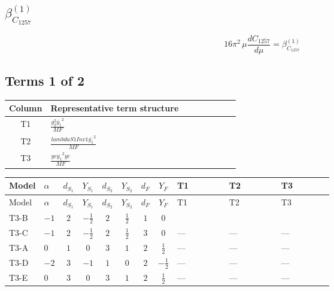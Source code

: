 \documentclass[8pt]{article}
\begin{document}
\begin{landscape}
\section*{$\beta_{C_{1257}}^{(1)}$}
\[16\pi^2\,\mu\frac{d C_{1257}}{d\mu}=\beta_{C_{1257}}^{(1)}\]
\subsection*{Terms 1 of 2}
\begin{center}
\begin{tabular}{@{}c >{\raggedright\arraybackslash}p{0.82\linewidth}@{}}
\toprule
Column & Representative term structure \\
\midrule
T1 & \(\displaystyle \frac{g_{2}^{2} \overline{y_{1}}^{2}}{MF}\) \\
\midrule
T2 & \(\displaystyle \frac{lambdaS1Inv1 \overline{y_{1}}^{2}}{MF}\) \\
\midrule
T3 & \(\displaystyle \frac{ye \overline{y_{1}}^{2} \overline{ye}}{MF}\) \\
\midrule
\bottomrule
\end{tabular}
\end{center}
\smallskip
\tiny
\begin{longtable}{@{}llcccccc >{\raggedright\arraybackslash}p{0.21\linewidth} >{\raggedright\arraybackslash}p{0.21\linewidth} >{\raggedright\arraybackslash}p{0.21\linewidth}@{}}
\toprule
Model & $\alpha$ & $d_{S_1}$ & $Y_{S_1}$ & $d_{S_2}$ & $Y_{S_2}$ & $d_F$ & $Y_F$ & T1 & T2 & T3 \\
\midrule
\endfirsthead
\toprule
Model & $\alpha$ & $d_{S_1}$ & $Y_{S_1}$ & $d_{S_2}$ & $Y_{S_2}$ & $d_F$ & $Y_F$ & T1 & T2 & T3 \\
\midrule
\endhead
T3-B & $-1$ & $2$ & $-\frac{1}{2}$ & $2$ & $\frac{1}{2}$ & $1$ & $0$ & \scriptsize\adjustbox{max width=\linewidth}{$\begin{gathered} - \frac{3 g_{2}^{2} \overline{y_{1}}^{2}}{8 MF}\end{gathered}$} & \scriptsize\adjustbox{max width=\linewidth}{$\begin{gathered} - \frac{lambdaS1Inv1 \overline{y_{1}}^{2}}{4 MF}\end{gathered}$} & \scriptsize\adjustbox{max width=\linewidth}{$\begin{gathered} \frac{ye \overline{y_{1}}^{2} \overline{ye}}{8 MF}\end{gathered}$} \\
\midrule
T3-C & $-1$ & $2$ & $-\frac{1}{2}$ & $2$ & $\frac{1}{2}$ & $3$ & $0$ & --- & --- & --- \\
\midrule
T3-A & $0$ & $1$ & $0$ & $3$ & $1$ & $2$ & $\frac{1}{2}$ & --- & --- & --- \\
\midrule
T3-D & $-2$ & $3$ & $-1$ & $1$ & $0$ & $2$ & $-\frac{1}{2}$ & --- & --- & --- \\
\midrule
T3-E & $0$ & $3$ & $0$ & $3$ & $1$ & $2$ & $\frac{1}{2}$ & --- & --- & --- \\
\midrule
\bottomrule
\end{longtable}
\clearpage

\end{landscape}
\end{document}
